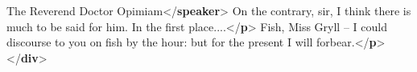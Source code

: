 \documentclass[11pt,twoside]{article}\makeatletter
\begin{document}
\begin{shaded}
\mbox{}\newline 
{}\mbox{}\newline 
\hspace*{6pt}The Reverend Doctor Opimiam{</\textbf{speaker}>}\mbox{}\newline 
\hspace*{6pt}On the contrary, sir, I think there is much to be said for him.\mbox{}\newline 
\hspace*{6pt}\hspace*{6pt}\hspace*{6pt}\hspace*{6pt} In the first place....{</\textbf{p}>}\mbox{}\newline 
\hspace*{6pt}Fish, Miss Gryll -- I could discourse to you on fish by\mbox{}\newline 
\hspace*{6pt}\hspace*{6pt}\hspace*{6pt}\hspace*{6pt} the hour: but for the present I will forbear.{</\textbf{p}>}\mbox{}\newline 
{}\mbox{}\newline 
{</\textbf{div}>}\end{shaded}\egroup\par 
\end{document}
